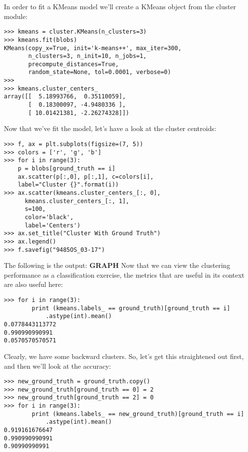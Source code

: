 \documentclass[SKL-MASTER.tex]{subfiles}
\begin{document}
In order to fit a KMeans model we'll create a KMeans object from the cluster module:
\begin{framed}
\begin{verbatim}
>>> kmeans = cluster.KMeans(n_clusters=3)
>>> kmeans.fit(blobs)
KMeans(copy_x=True, init='k-means++', max_iter=300, 
       n_clusters=3, n_init=10, n_jobs=1,
       precompute_distances=True,
       random_state=None, tol=0.0001, verbose=0)
>>>
>>> kmeans.cluster_centers_
array([[  5.18993766,  0.35110059],
       [  0.18300097, -4.9480336 ],
       [ 10.01421381, -2.26274328]])
       \end{verbatim}
    \end{framed}
Now that we've fit the model, let's have a look at the cluster centroids:
\begin{framed}
\begin{verbatim}
>>> f, ax = plt.subplots(figsize=(7, 5))
>>> colors = ['r', 'g', 'b']
>>> for i in range(3):
    p = blobs[ground_truth == i]
    ax.scatter(p[:,0], p[:,1], c=colors[i],
    label="Cluster {}".format(i))
>>> ax.scatter(kmeans.cluster_centers_[:, 0],
      kmeans.cluster_centers_[:, 1], 
      s=100, 
      color='black',
      label='Centers')
>>> ax.set_title("Cluster With Ground Truth")
>>> ax.legend()
>>> f.savefig("9485OS_03-17")
\end{verbatim}
\end{framed}
\noindent The following is the output: \textbf{GRAPH}
Now that we can view the clustering performance as a classification exercise, the metrics that
are useful in its context are also useful here:
{
\large
\begin{framed}
\begin{verbatim}
>>> for i in range(3):
		print (kmeans.labels_ == ground_truth)[ground_truth == i]
			.astype(int).mean()
0.0778443113772
0.990990990991
0.0570570570571
\end{verbatim}
\end{framed}
}
Clearly, we have some backward clusters. So, let's get this straightened out first, and then
we'll look at the accuracy:
{
\large
\begin{framed}
\begin{verbatim}
>>> new_ground_truth = ground_truth.copy()
>>> new_ground_truth[ground_truth == 0] = 2
>>> new_ground_truth[ground_truth == 2] = 0
>>> for i in range(3):
		print (kmeans.labels_ == new_ground_truth)[ground_truth == i]
			.astype(int).mean()
0.919161676647
0.990990990991
0.90990990991
\end{verbatim}
\end{framed}
}
\end{document}
